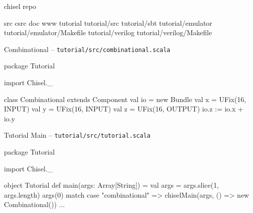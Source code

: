 \documentclass[xcolor=pdflatex,dvipsnames,table]{beamer}
\begin{document}
\begin{frame}[fragile]{chisel repo}
\begin{FramedSemiVerb}
src                        
csrc                       
doc                        
www                        
tutorial                   
tutorial/src               
tutorial/sbt               
tutorial/emulator          
tutorial/emulator/Makefile  
tutorial/verilog            
tutorial/verilog/Makefile   
\end{FramedSemiVerb}
\end{frame}

\begin{frame}[fragile]{Combinational -- \tt\small tutorial/src/combinational.scala}
\begin{scala}
package Tutorial

import Chisel._

class Combinational extends Component {
  val io = new Bundle {
    val x = UFix(16, INPUT)
    val y = UFix(16, INPUT)
    val z = UFix(16, OUTPUT)
  }
  io.z := io.x + io.y
}
\end{scala}
\end{frame}

\begin{frame}[fragile]{Tutorial Main -- \tt tutorial/src/tutorial.scala}

\begin{scala}
package Tutorial

import Chisel._

object Tutorial {
  def main(args: Array[String]) = {
    val args = args.slice(1, args.length)
    args(0) match {
      case "combinational" => 
        chiselMain(args, () => new Combinational())
      ...
    }
  }
}
\end{scala}
\end{frame}
\end{document}

